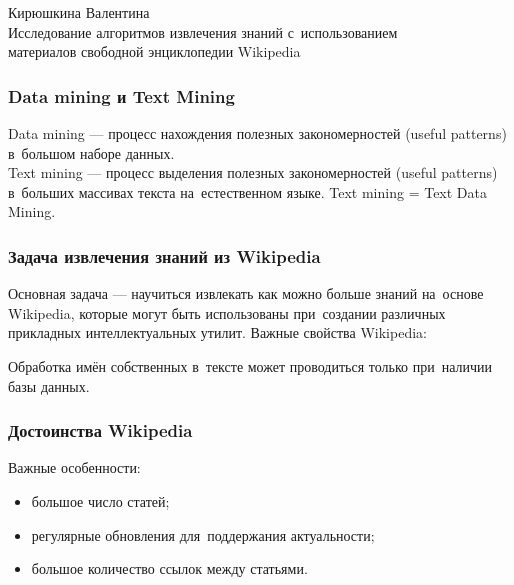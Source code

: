 \documentclass{beamer}
\begin{document}
\begin{frame}
\begin{center}
Кирюшкина Валентина \\
\vspace{1cm}
{\Large Исследование алгоритмов извлечения знаний с~использованием\\ 
материалов свободной энциклопедии Wikipedia}\\ 
\end{center}
\end{frame}

\begin{frame}
\frametitle{Data mining и Text Mining}
Data mining --- процесс нахождения полезных закономерностей (useful patterns)  в~большом наборе данных.\\
\vspace{1cm}
Text mining --- процесс выделения полезных закономерностей (useful patterns) 
в~больших массивах текста на~естественном языке. 
Text mining = Text Data Mining.
\end{frame}

\begin{frame}
\frametitle{Задача извлечения знаний из Wikipedia}
Основная задача --- научиться извлекать как можно больше знаний на~основе Wikipedia,
которые могут быть использованы  при~создании различных прикладных интеллектуальных утилит.
Важные свойства Wikipedia:

\begin{enumerate}

\item {Одна статья --- одно понятие (сущность).
\item{Предоставляет материалы по именам собственным.}

\end{enumerate}

Обработка имён собственных в~тексте может проводиться только при~наличии базы данных.

\end{frame}

\begin{frame}
\frametitle{Достоинства Wikipedia}

Важные особенности:
\begin{itemize}
\item{большое число статей;}
\item{регулярные обновления для~поддержания актуальности;}
\item{большое количество ссылок между статьями.}
\end{itemize}

\end{frame}
\end{document}
